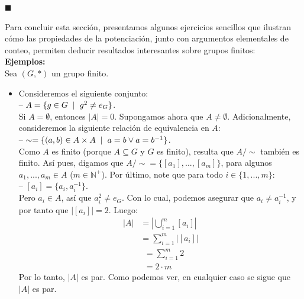 \documentclass[10 pt]{article}
\begin{document}
\begin{flushright}
$\blacksquare$
\end{flushright}

\Large{Para concluir esta sección, presentamos algunos ejercicios sencillos que ilustran cómo las propiedades de la potenciación, junto con argumentos elementales de conteo, permiten deducir resultados interesantes sobre grupos finitos:} \\

\Large{\textbf{Ejemplos:}} \\

\Large{Sea $(G,*)$ un grupo finito.} \\

\begin{itemize}
    \item \Large{Consideremos el siguiente conjunto: \\

    -- $A=\{g \in G \hspace{0.2 cm}|\hspace{0.2 cm}g^2 \neq e_G\}$. \\

    Si $A=\emptyset$, entonces $|A|=0$. Supongamos ahora que $A \neq \emptyset$. Adicionalmente, consideremos la siguiente relación de equivalencia en $A$: \\

    -- $\sim=\{(a,b) \in A \times A \hspace{0.2 cm}|\hspace{0.2 cm}a=b \lor a=b^{-1}\}$. \\

    Como $A$ es finito (porque $A \subseteq G$ y $G$ es finito), resulta que $A/\sim$ también es finito. Así pues, digamos que $A/\sim=\{[a_1],...,[a_m]\}$, para algunos $a_1,...,a_m \in A$ ($m \in \mathbb N^+$). Por último, note que para todo $i \in \{1,...,m\}$: \\

    -- $[a_i]=\{a_i,a_i^{-1}\}$. \\

    Pero $a_i \in A$, así que $a_i^2 \neq e_G$. Con lo cual, podemos asegurar que $a_i \neq a_i^{-1}$, y por tanto que $|[a_i]|=2$. Luego:}
    \begin{align*}
        |A|&=\left |\bigcup_{i=1}^{m}[a_i] \right| \\
         &=\sum_{i=1}^m|[a_i]|
    \end{align*}
    \begin{align*}
    &=\sum_{i=1}^m2 \\
    &=2 \cdot m
    \end{align*}
    \Large{Por lo tanto, $|A|$ es par. Como podemos ver, en cualquier caso se sigue que $|A|$ es par.} \\
    

\end{itemize}
\end{document}
